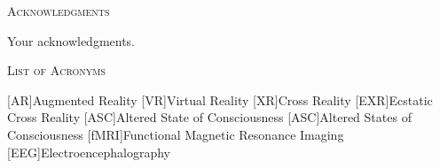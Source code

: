 \documentclass{UIdahoMastersThesis}
\begin{document}
\newpage


 \begin{center}
 	{\LARGE\textsc{Acknowledgments}}
 \end{center}
 
Your acknowledgments.

\newpage


   
   


\tableofcontents
\newpage




\listoffigures
\newpage




\begin{center}
	{\LARGE\textsc{List of Acronyms}}
\end{center}

\begin{acronym}[fMRI]  %
	[{\textup{AR}}]{Augmented Reality}
	[{\textup{VR}}]{Virtual Reality}
	[{\textup{XR}}]{Cross Reality}
	[{\textup{EXR}}]{Ecstatic Cross Reality}
	[{\textup{ASC}}]{Altered State of Consciousness}
	[{\textup{ASC}}]{Altered States of Consciousness}
	[{\textup{fMRI}}]{Functional Magnetic Resonance Imaging}
	[{\textup{EEG}}]{Electroencephalography}
\end{acronym}
\end{document}
